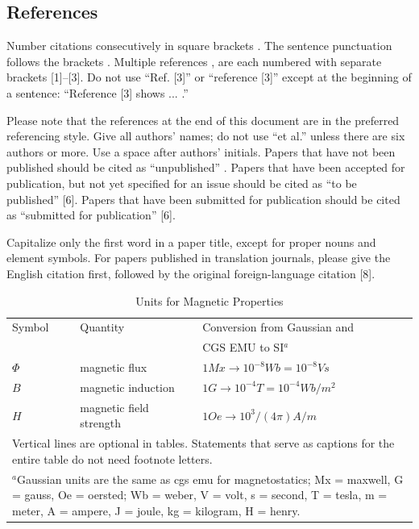 \documentclass[journal,a4paper,onecolumn]{IEEEtran}
\begin{document}
\subsection{References}

Number citations consecutively in square brackets \cite{Calvetti}. The sentence punctuation follows the brackets \cite{Pan}. Multiple references \cite{Pan}, \cite{Pan} are each numbered with separate brackets [1]–[3]. Do not use ``Ref. [3]'' or ``reference [3]'' except at the beginning of a sentence: ``Reference [3] shows ... .''

Please note that the references at the end of this document are in the preferred referencing style. Give all authors’ names; do not use ``et al.'' unless there are six authors or more. Use a space after authors’ initials. Papers that have not been published should be cited as ``unpublished'' \cite{Johansson}. Papers that have been accepted for publication, but not yet specified for an issue should be cited as ``to be published'' [6]. Papers that have been submitted for publication should be cited as ``submitted for publication'' [6].

Capitalize only the first word in a paper title, except for proper nouns and element symbols. For papers published in translation journals, please give the English citation first, followed by the original foreign-language citation [8].

\begin{table}[!t]
	\renewcommand{\arraystretch}{1.3}
	\caption{Units for Magnetic Properties}
	\label{table_example}
	\centering
	\begin{tabular}{lll}
		\hline\hline
		Symbol & Quantity & Conversion from Gaussian and\\
		& &  CGS EMU to SI$^a$ \\
		\hline
		$\Phi$ & magnetic flux & $1 Mx\rightarrow10^{-8}Wb=10^{-8}Vs$\\
		$B$ & magnetic induction & $1 G\rightarrow10^{-4}T=10^{-4}Wb/m^2$ \\
		$H$ & magnetic field strength & $1 Oe\rightarrow10^3/(4\pi)A/m$ \\
		\hline\hline
		\multicolumn{3}{p{0.95\columnwidth}}{Vertical lines are optional in tables. Statements that serve as captions for the entire table do not need footnote letters.}\\
		\multicolumn{3}{p{0.95\columnwidth}}{$^a$Gaussian units are the same as cgs emu for magnetostatics; Mx = maxwell, G = gauss, Oe = oersted; Wb = weber, V = volt, s = second, T = tesla, m = meter, A = ampere, J = joule, kg = kilogram, H = henry.}
	\end{tabular}
\end{table}
\end{document}
